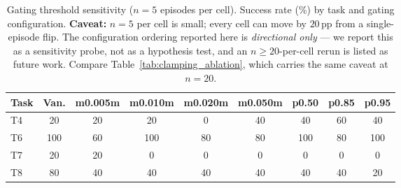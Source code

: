 \begin{table}[t]
\centering
\small
\caption{Gating threshold sensitivity ($n{=}5$ episodes per cell). Success rate (\%) by task and gating configuration. \textbf{Caveat:} $n{=}5$ per cell is small; every cell can move by $20$\,pp from a single-episode flip. The configuration ordering reported here is \emph{directional only} --- we report this as a sensitivity probe, not as a hypothesis test, and an $n{\ge}20$-per-cell rerun is listed as future work. Compare Table~\ref{tab:clamping_ablation}, which carries the same caveat at $n{=}20$.}
\label{tab:gating_ablation}
\begin{tabular}{lcccccccc}
\toprule
Task & Van. & m0.005m & m0.010m & m0.020m & m0.050m & p0.50 & p0.85 & p0.95 \\
\midrule
T4 & 20 & 20 & 20 & 0 & 40 & 40 & 60 & 40 \\
T6 & 100 & 60 & 100 & 80 & 80 & 100 & 80 & 100 \\
T7 & 20 & 20 & 0 & 0 & 0 & 0 & 0 & 0 \\
T8 & 80 & 40 & 40 & 40 & 40 & 40 & 40 & 20 \\
\bottomrule
\end{tabular}
\end{table}
